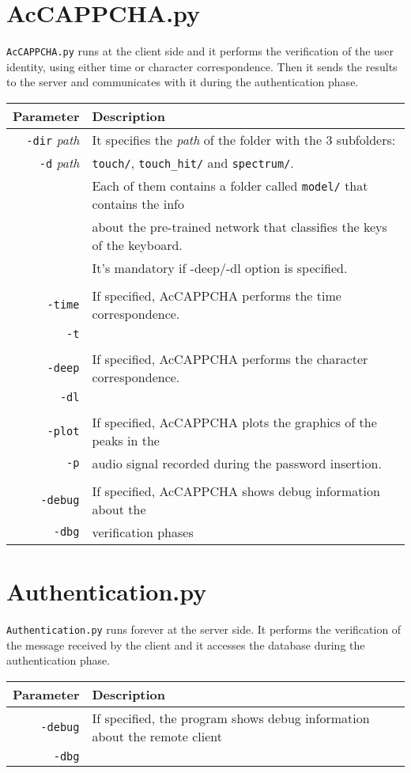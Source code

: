 \section{AcCAPPCHA.py}
\texttt{AcCAPPCHA.py} runs at the client side and it performs the verification of the user identity, using either time or character correspondence. Then it sends the results to the server and communicates with it during the authentication phase.

{\footnotesize
\begin{longtable}{rl}
\hline
\textbf{Parameter} & \textbf{Description}\\
\hline
\texttt{-dir} \textit{path} & It specifies the \textit{path} of the folder with the 3 subfolders:\\
\texttt{-d} \textit{path} & \texttt{touch/}, \texttt{touch\_hit/} and \texttt{spectrum/}.\\
& Each of them contains a folder called \texttt{model/} that contains the info\\
& about the pre-trained network that classifies the keys of the keyboard.\\
& It's mandatory if -deep/-dl option is specified.\\
&\\
\texttt{-time} & If specified, AcCAPPCHA performs the time correspondence.\\
\texttt{-t} & \\
&\\
\texttt{-deep} & If specified, AcCAPPCHA performs the character correspondence.\\
\texttt{-dl} & \\
&\\
\texttt{-plot} & If specified, AcCAPPCHA plots the graphics of the peaks in the\\
\texttt{-p} & audio signal recorded during the password insertion.\\
&\\
\texttt{-debug} & If specified, AcCAPPCHA shows debug information about the\\
\texttt{-dbg} & verification phases\\
\hline
\end{longtable}}

\section{Authentication.py}
\texttt{Authentication.py} runs forever at the server side. It performs the verification of the message received by the client and it accesses the database during the authentication phase.
\begin{table}[h]
\centering\footnotesize
\begin{tabular}{rl}
\hline
\textbf{Parameter} & \textbf{Description}\\
\hline
\texttt{-debug} & If specified, the program shows debug information about the remote client\\
\texttt{-dbg} &\\
\hline
\end{tabular}
\end{table}